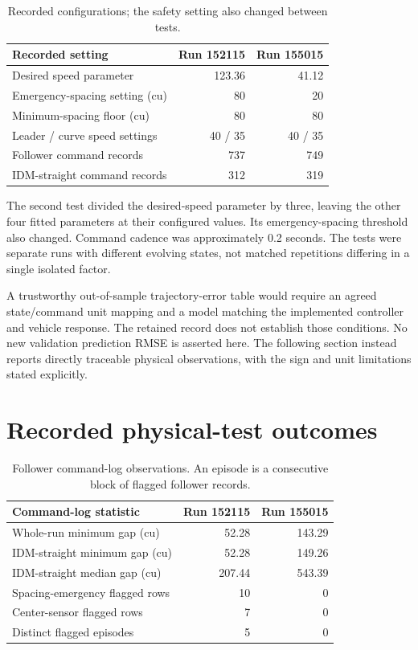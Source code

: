 \documentclass[11pt,a4paper]{article}
\begin{document}
\begin{table}[H]\centering\small
\caption{Recorded configurations; the safety setting also changed between tests.}
\begin{tabular}{lrr}
\toprule
Recorded setting & Run 152115 & Run 155015 \\
\midrule
Desired speed parameter & 123.36 & 41.12 \\
Emergency-spacing setting (cu) & 80 & 20 \\
Minimum-spacing floor (cu) & 80 & 80 \\
Leader / curve speed settings & 40 / 35 & 40 / 35 \\
Follower command records & 737 & 749 \\
IDM-straight command records & 312 & 319 \\
\bottomrule\end{tabular}\end{table}

The second test divided the desired-speed parameter by three, leaving the other four fitted parameters at their configured values. Its emergency-spacing threshold also changed. Command cadence was approximately 0.2 seconds. The tests were separate runs with different evolving states, not matched repetitions differing in a single isolated factor.


A trustworthy out-of-sample trajectory-error table would require an agreed state/command unit mapping and a model matching the implemented controller and vehicle response. The retained record does not establish those conditions. No new validation prediction RMSE is asserted here. The following section instead reports directly traceable physical observations, with the sign and unit limitations stated explicitly.


\newpage

\section{Recorded physical-test outcomes}

\begin{table}[H]\centering\small
\caption{Follower command-log observations. An episode is a consecutive block of flagged follower records.}
\begin{tabular}{lrr}
\toprule
Command-log statistic & Run 152115 & Run 155015 \\
\midrule
Whole-run minimum gap (cu) & 52.28 & 143.29 \\
IDM-straight minimum gap (cu) & 52.28 & 149.26 \\
IDM-straight median gap (cu) & 207.44 & 543.39 \\
Spacing-emergency flagged rows & 10 & 0 \\
Center-sensor flagged rows & 7 & 0 \\
Distinct flagged episodes & 5 & 0 \\
\bottomrule\end{tabular}\end{table}
\end{document}
